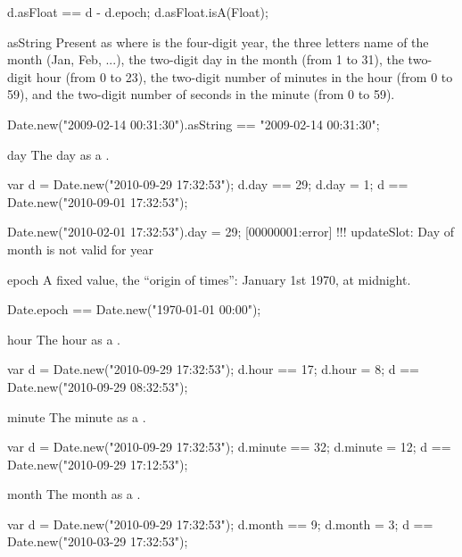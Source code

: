 \begin{urbiscriptapi}
\begin{urbiassert}
d.asFloat == d - d.epoch;
d.asFloat.isA(Float);
\end{urbiassert}


\item[asString] Present as  where  is the four-digit
  year,  the three letters name of the month (Jan, Feb, ...),
   the two-digit day in the month (from 1 to 31),  the
  two-digit hour (from 0 to 23),  the two-digit number of minutes in
  the hour (from 0 to 59), and  the two-digit number of seconds in
  the minute (from 0 to 59).
\begin{urbiassert}
Date.new("2009-02-14 00:31:30").asString == "2009-02-14 00:31:30";
\end{urbiassert}


\item[day]
  The day as a .
\begin{urbiassert}
var d = Date.new("2010-09-29 17:32:53");
d.day == 29;
d.day = 1;
d == Date.new("2010-09-01 17:32:53");
\end{urbiassert}
\begin{urbiscript}
Date.new("2010-02-01 17:32:53").day = 29;
[00000001:error] !!! updateSlot: Day of month is not valid for year
\end{urbiscript}


\item[epoch]
  A fixed value, the ``origin of times'': January 1st 1970, at
  midnight.
\begin{urbiunchecked}
Date.epoch == Date.new("1970-01-01 00:00");
\end{urbiunchecked}


\item[hour]
  The hour as a .
\begin{urbiassert}
var d = Date.new("2010-09-29 17:32:53");
d.hour == 17;
d.hour = 8;
d == Date.new("2010-09-29 08:32:53");
\end{urbiassert}


\item[minute]
  The minute as a .
\begin{urbiassert}
var d = Date.new("2010-09-29 17:32:53");
d.minute == 32;
d.minute = 12;
d == Date.new("2010-09-29 17:12:53");
\end{urbiassert}


\item[month]
  The month as a .
\begin{urbiassert}
var d = Date.new("2010-09-29 17:32:53");
d.month == 9;
d.month = 3;
d == Date.new("2010-03-29 17:32:53");
\end{urbiassert}



\end{urbiscriptapi}

